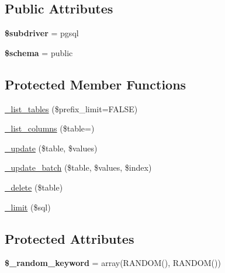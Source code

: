 \subsection*{Public Attributes}
\begin{DoxyCompactItemize}
\item 
\mbox{\label{class_c_i___d_b__pdo__pgsql__driver_abd660d57a6b734e4c6ca06472f19f402}} 
{\bfseries \$subdriver} = \textquotesingle{}pgsql\textquotesingle{}
\item 
\mbox{\label{class_c_i___d_b__pdo__pgsql__driver_ad8cd3c7bbef2afc5f4c73763c5f2c1d2}} 
{\bfseries \$schema} = \textquotesingle{}public\textquotesingle{}
\end{DoxyCompactItemize}
\subsection*{Protected Member Functions}
\begin{DoxyCompactItemize}
\item 
\mbox{\hyperlink{class_c_i___d_b__pdo__pgsql__driver_ae656903b5c0a917abd518ba372de10cc}{\+\_\+list\+\_\+tables}} (\$prefix\+\_\+limit=F\+A\+L\+SE)
\item 
\mbox{\hyperlink{class_c_i___d_b__pdo__pgsql__driver_a5169cf672887f2107c9170c8e145807a}{\+\_\+list\+\_\+columns}} (\$table=\textquotesingle{}\textquotesingle{})
\item 
\mbox{\hyperlink{class_c_i___d_b__pdo__pgsql__driver_ad24b27475d709e8da16b1192ce451727}{\+\_\+update}} (\$table, \$values)
\item 
\mbox{\hyperlink{class_c_i___d_b__pdo__pgsql__driver_a1e775cea1602a6913a073f82019456e5}{\+\_\+update\+\_\+batch}} (\$table, \$values, \$index)
\item 
\mbox{\hyperlink{class_c_i___d_b__pdo__pgsql__driver_a2d33f0da7617fe426bf7f65cd51a78db}{\+\_\+delete}} (\$table)
\item 
\mbox{\hyperlink{class_c_i___d_b__pdo__pgsql__driver_a318e57fd3c345f251f3320b4ccd3a96b}{\+\_\+limit}} (\$sql)
\end{DoxyCompactItemize}
\subsection*{Protected Attributes}
\begin{DoxyCompactItemize}
\item 
\mbox{\label{class_c_i___d_b__pdo__pgsql__driver_acd9d64cb519de2000724603ff2cfae00}} 
{\bfseries \$\+\_\+random\+\_\+keyword} = array(\textquotesingle{}R\+A\+N\+D\+OM()\textquotesingle{}, \textquotesingle{}R\+A\+N\+D\+OM()\textquotesingle{})
\end{DoxyCompactItemize}


